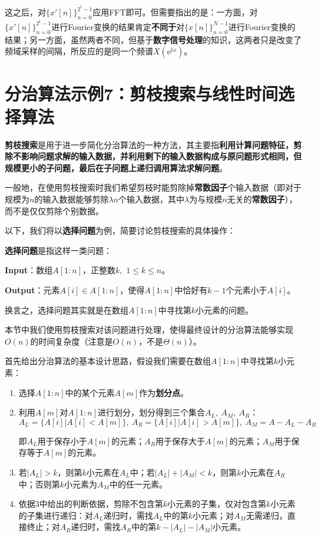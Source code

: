 \documentclass[12pt,a4paper,violet,oneside]{bbe}
\begin{document}
这之后，对$\{x'[n]\}_{n=0}^{2^t-1}$应用FFT即可。但需要指出的是：一方面，对$\{x'[n]\}_{n=0}^{2^t-1}$进行Fourier变换的结果肯定\textbf{不同于}对$\{x[n]\}_{n=0}^{N-1}$进行Fourier变换的结果；另一方面，虽然两者不同，但基于\textbf{数字信号处理}的知识，这两者只是改变了频域采样的间隔，所反应的是同一个频谱$X(\mathrm{e^{j\omega}})$。
\section{分治算法示例7：剪枝搜索与线性时间选择算法}
\textbf{剪枝搜索}是用于进一步简化分治算法的一种方法，其主要指\textbf{利用计算问题特征，剪除不影响问题求解的输入数据，并利用剩下的输入数据构成与原问题形式相同，但规模更小的子问题，最后在子问题上递归调用算法求解问题}。

一般地，在使用剪枝搜索时我们希望剪枝时能剪除掉\textbf{常数因子}个输入数据（即对于规模为$n$的输入数据能够剪除$\lambda n$个输入数据，其中$\lambda$为与规模$n$无关的\textbf{常数因子}），而不是仅仅剪除个别数据。

以下，我们将以\textbf{选择问题}为例，简要讨论剪枝搜索的具体操作：
\begin{example}
	\textbf{选择问题}是指这样一类问题：
	
	\textbf{Input}：数组$A[1:n]$，正整数$k$,~$1\leqslant k\leqslant n$。
	
	\textbf{Output}：元素$A[i]\in A[1:n]$，使得$A[1:n]$中恰好有$k-1$个元素小于$A[i]$。
	
	换言之，选择问题其实就是在数组$A[1:n]$中寻找第$k$小元素的问题。
\end{example}

本节中我们使用剪枝搜索对该问题进行处理，使得最终设计的分治算法能够实现$O(n)$的时间复杂度（注意是$O(n)$，不是$\Theta(n)$）。

首先给出分治算法的基本设计思路，假设我们需要在数组$A[1:n]$中寻找第$k$小元素：
\begin{enumerate}
	\item 选择$A[1:n]$中的某个元素$A[m]$作为\textbf{划分点}。
	\item 利用$A[m]$对$A[1:n]$进行划分，划分得到三个集合$A_L,~A_M,~A_R$：
	$$
	A_L=\{A[i]|A[i]<A[m]\},~A_R=\{A[i]|A[i]>A[m]\},~A_M=A-A_L-A_R
	$$
	
	即$A_L$用于保存小于$A[m]$的元素；$A_R$用于保存大于$A[m]$的元素；$A_M$用于保存等于$A[m]$的元素。
	\item 若$|A_L|>k$，则第$k$小元素在$A_L$中；若$|A_L|+|A_M|<k$，则第$k$小元素在$A_R$中；否则第$k$小元素为$A_M$中的任一元素。
	\item 依据3中给出的判断依据，剪除不包含第$k$小元素的子集，仅对包含第$k$小元素的子集进行递归：对$A_L$递归时，需找$A_L$中的第$k$小元素；对$A_M$无需递归，直接终止；对$A_R$递归时，需找$A_R$中的第$k-|A_L|-|A_M|$小元素。
\end{enumerate}
\end{document}

